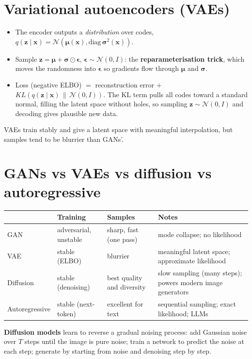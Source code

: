 \section{Variational autoencoders (VAEs)}
\begin{itemize}
\item The encoder outputs a \emph{distribution} over codes, $q(\mathbf z\mid\mathbf x) = \mathcal N(\boldsymbol\mu(\mathbf x),\text{diag}\,\boldsymbol\sigma^2(\mathbf x))$.
\item Sample $\mathbf z = \boldsymbol\mu + \boldsymbol\sigma\odot\boldsymbol\epsilon$, $\boldsymbol\epsilon\sim\mathcal N(0, I)$: the \textbf{reparameterisation trick}, which moves
  the randomness into $\boldsymbol\epsilon$ so gradients flow through $\boldsymbol\mu$ and $\boldsymbol\sigma$.
\item Loss (negative ELBO) $=$ reconstruction error $+$ $KL(q(\mathbf z\mid\mathbf x)\,\|\,\mathcal N(0, I))$. The KL term pulls all codes toward a standard normal, filling the
  latent space without holes, so sampling $\mathbf z\sim\mathcal N(0, I)$ and decoding gives plausible new data.
\end{itemize}
VAEs train stably and give a latent space with meaningful interpolation, but samples tend to be blurrier than GANs'.

\section{GANs vs VAEs vs diffusion vs autoregressive}
\begin{center}\small
\begin{tabularx}{\linewidth}{l X X X}
\toprule
& Training & Samples & Notes\\
\midrule
GAN & adversarial, unstable & sharp, fast (one pass) & mode collapse; no likelihood\\
VAE & stable (ELBO) & blurrier & meaningful latent space; approximate likelihood\\
Diffusion & stable (denoising) & best quality and diversity & slow sampling (many steps); powers modern image generators\\
Autoregressive & stable (next-token) & excellent for text & sequential sampling; exact likelihood; LLMs\\
\bottomrule
\end{tabularx}
\end{center}
\textbf{Diffusion models} learn to reverse a gradual noising process: add Gaussian noise over $T$ steps until the image is pure noise; train a network to predict the noise at
each step; generate by starting from noise and denoising step by step.

